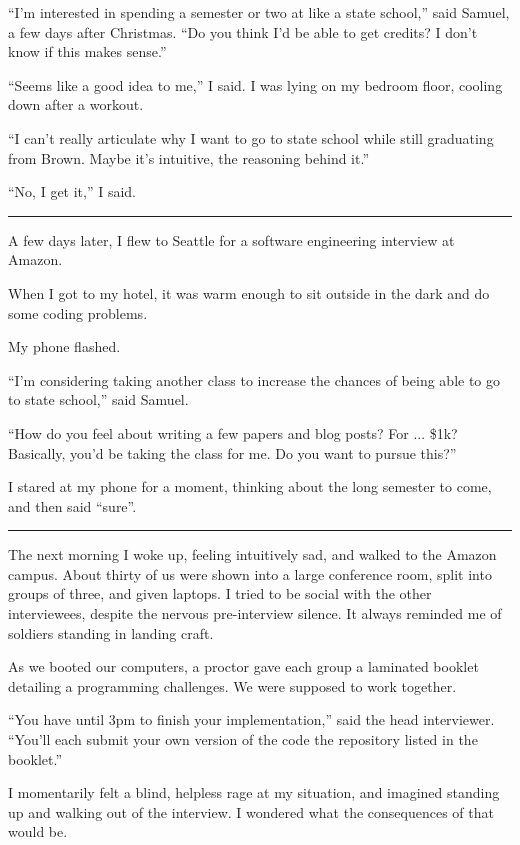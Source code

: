 ``I'm interested in spending a semester or two at like a state school,'' said
Samuel, a few days after Christmas.  ``Do you think I'd be able to get credits?
I don't know if this makes sense.''

``Seems like a good idea to me,'' I said.  I was lying on my bedroom floor,
cooling down after a workout.  

``I can't really articulate why I want to go to state school while still
graduating from Brown.   Maybe it's intuitive, the reasoning behind it.'' 

``No, I get it,'' I said. 

\plainfancybreak{12pt}{2}{* * *}

A few days later, I flew to Seattle for a software engineering interview at
Amazon.

When I got to my hotel, it was warm enough to sit outside in the dark and do
some coding problems.

My phone flashed.

``I'm considering taking another class to increase the chances of being able to
go to state school,'' said Samuel.  

``How do you feel about writing a few papers and blog posts?  For ... \$1k?
Basically, you'd be taking the class for me.  Do you want to pursue this?'' 

I stared at my phone for a moment, thinking about the long semester to come, and
then said ``sure''.

\plainfancybreak{12pt}{2}{* * *}

The next morning I woke up, feeling intuitively sad, and walked to the Amazon
campus.  About thirty of us were shown into a large conference room, split into
groups of three, and given laptops.  I tried to be social with the other
interviewees, despite the nervous pre-interview silence.  It always reminded me of
soldiers standing in landing craft.

As we booted our computers, a proctor gave each group a laminated booklet
detailing a programming challenges.  We were supposed to work together.

``You have until 3pm to finish your implementation,'' said the head interviewer.
``You'll each submit your own version of the code the repository listed in the
booklet.''

I momentarily felt a blind, helpless rage at my situation, and imagined standing
up and walking out of the interview.  I wondered what the consequences of that
would be.  

